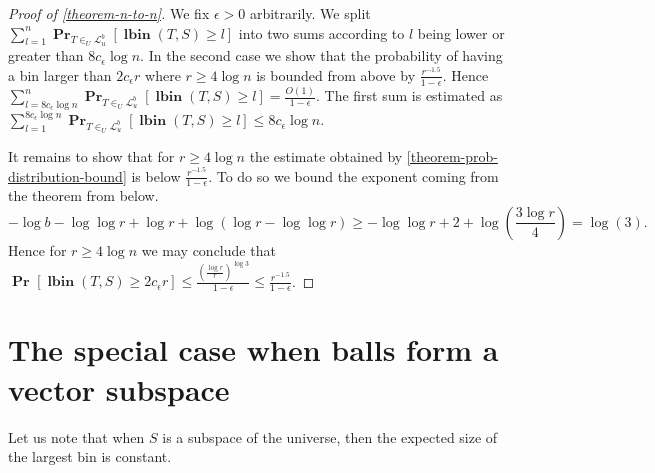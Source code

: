\documentclass[unicode,review]{siamart1116}
\newcommand{\lbin}[2]{\operatorname{\mathbf{lbin}}({#1}, {#2})}
\newcommand{\linearmaps}[2]{\mathcal{L}_{#1}^{#2}}
\newcommand{\probs}[2]{\operatorname{\mathbf{Pr}}_{{#1}}\left[{#2}\right]}
\newcommand{\prob}[1]{\probs{}{#1}}
\numberwithin{theorem}{section}
\begin{document}
\begin{proof}[Proof of \cref{theorem-n-to-n}]
We fix $\epsilon > 0$ arbitrarily.
We split $\sum_{l = 1}^{n} \probs{T\in_U\linearmaps{u}{b}}{\lbin{T}{S} \geq l}$ into two sums according to $l$ being lower or greater than $8c_\epsilon \log n$.
In the second case we show that the probability of having a bin larger than $2 c_\epsilon r$ where $r \geq 4\log n$ is bounded from above by $\frac{r^{-1.5}}{1-\epsilon}$.
Hence $\sum_{l = 8c_\epsilon \log n}^{n} \probs{T\in_U\linearmaps{u}{b}}{\lbin{T}{S} \geq l} = \frac{O(1)}{1-\epsilon}$.
The first sum is estimated as $\sum_{l = 1}^{8c_\epsilon \log n} \probs{T\in_U\linearmaps{u}{b}}{\lbin{T}{S} \geq l} \leq 8c_\epsilon \log n$.

It remains to show that for $r \geq 4 \log n$ the estimate obtained by \cref{theorem-prob-distribution-bound} is below $\frac{r^{-1.5}}{1-\epsilon}$.
To do so we bound the exponent coming from the theorem from below.
\[
-\log b - \log \log r + \log r + \log (\log r - \log \log r) \geq -\log \log r + 2 + \log \left(\frac{3\log r}{4}\right) = \log(3).
\]
Hence for $r \geq 4\log n$ we may conclude that $\prob{\lbin{T}{S} \geq 2c_\epsilon r} \leq \frac{\left(\frac{\log r}{r}\right)^{\log 3}}{1-\epsilon} \leq \frac{r^{-1.5}}{1-\epsilon}$.
\end{proof}

\section{The special case when balls form a vector subspace}

Let us note that when $S$ is a subspace of the universe, then the expected size of the largest bin is constant.
\end{document}
